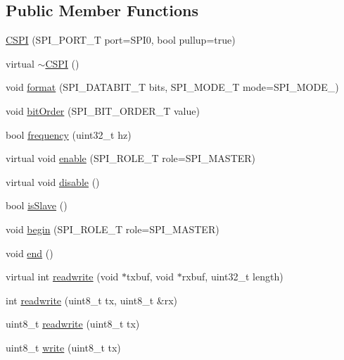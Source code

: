 \subsection*{Public Member Functions}
\begin{DoxyCompactItemize}
\item 
\hyperlink{class_c_s_p_i_a45ebc1852b74f5f0ccfbb97b302cf5e9}{C\-S\-P\-I} (S\-P\-I\-\_\-\-P\-O\-R\-T\-\_\-\-T port=S\-P\-I0, bool pullup=true)
\item 
virtual \hyperlink{class_c_s_p_i_ade8c01d1d751682ededa1cb27ab85409}{$\sim$\-C\-S\-P\-I} ()
\item 
void \hyperlink{class_c_s_p_i_accc9a5c831ee85e95f0bb5567de5f529}{format} (S\-P\-I\-\_\-\-D\-A\-T\-A\-B\-I\-T\-\_\-\-T bits, S\-P\-I\-\_\-\-M\-O\-D\-E\-\_\-\-T mode=S\-P\-I\-\_\-\-M\-O\-D\-E\-\_)
\item 
void \hyperlink{class_c_s_p_i_aa7a160dad74689b9afb720c78d63558f}{bit\-Order} (S\-P\-I\-\_\-\-B\-I\-T\-\_\-\-O\-R\-D\-E\-R\-\_\-\-T value)
\item 
bool \hyperlink{class_c_s_p_i_ad8143fa5be48bc62762fda52b86d630a}{frequency} (uint32\-\_\-t hz)
\item 
virtual void \hyperlink{class_c_s_p_i_a7dc9ce9f0b38a59f7332e6f4f39864e8}{enable} (S\-P\-I\-\_\-\-R\-O\-L\-E\-\_\-\-T role=S\-P\-I\-\_\-\-M\-A\-S\-T\-E\-R)
\item 
virtual void \hyperlink{class_c_s_p_i_a5009ac7cc08bcf2b1d1be19b320424e6}{disable} ()
\item 
bool \hyperlink{class_c_s_p_i_ab237c0acc917287a8f7cdca7e91e87c6}{is\-Slave} ()
\item 
void \hyperlink{class_c_s_p_i_a98fb4712f52c9977d4973430f5f505b8}{begin} (S\-P\-I\-\_\-\-R\-O\-L\-E\-\_\-\-T role=S\-P\-I\-\_\-\-M\-A\-S\-T\-E\-R)
\item 
void \hyperlink{class_c_s_p_i_a9a8f9843e54bf4f11dd871cf798fe337}{end} ()
\item 
virtual int \hyperlink{class_c_s_p_i_a5215a320db4cb5f2792ea18f8d6e0671}{readwrite} (void $\ast$txbuf, void $\ast$rxbuf, uint32\-\_\-t length)
\item 
int \hyperlink{class_c_s_p_i_a0cdfe6a4d42e835cf7b67ba99ae115ca}{readwrite} (uint8\-\_\-t tx, uint8\-\_\-t \&rx)
\item 
uint8\-\_\-t \hyperlink{class_c_s_p_i_acf2e1695f717fa88620e4bddd7871ea3}{readwrite} (uint8\-\_\-t tx)
\item 
uint8\-\_\-t \hyperlink{class_c_s_p_i_a2b91318925ae9de3f295abd2418285c4}{write} (uint8\-\_\-t tx)
\item 

\end{DoxyCompactItemize}
